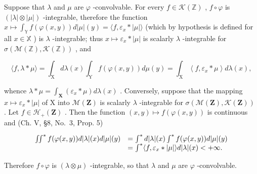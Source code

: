 Suppose that \(\lambda\) and \(\mu\) are \(\varphi\) -convolvable. For every \(f \in \mathcal{K}(\mathbb{Z})\) , \(f \circ \varphi\) is \((|\lambda| \otimes |\mu|)\) -integrable, therefore the function \(x \mapsto \int_{\mathbb{Y}} f(\varphi(x, y)) d|\mu|(y) = \langle f, \varepsilon_x * |\mu| \rangle\) (which by hypothesis is defined for all \(x \in \mathbb{X}\) ) is \(\lambda\) -integrable; thus \(x \mapsto \varepsilon_x * |\mu|\) is scalarly \(\lambda\) -integrable for \(\sigma(\mathcal{M}(\mathbb{Z}), \mathcal{K}(\mathbb{Z}))\) , and

\[
\langle f, \lambda * \mu \rangle = \int_ {\mathrm{X}} d \lambda (x) \int_ {\mathrm{Y}} f (\varphi (x, y)) d \mu (y) = \int_ {\mathrm{X}} \left\langle f, \varepsilon_ {x} * \mu \right\rangle d \lambda (x),
\]

whence \(\lambda * \mu = \int_{\mathbf{X}} (\varepsilon_x * \mu) d\lambda(x)\) . Conversely, suppose that the mapping \(x \mapsto \varepsilon_x * |\mu|\) of X into \(\mathcal{M}(\mathbf{Z})\) is scalarly \(\lambda\) -integrable for \(\sigma(\mathcal{M}(\mathbf{Z}), \mathcal{K}(\mathbf{Z}))\) . Let \(f \in \mathcal{H}_+(\mathbf{Z})\) . Then the function \((x,y) \mapsto f(\varphi(x,y))\) is continuous and (Ch. V, §8, No.~3, Prop. 5)

\[
\begin{array}{r l} \iint^ {*} f (\varphi (x, y)) d | \lambda | (x) d | \mu | (y) & = \int^ {*} d | \lambda | (x) \int^ {*} f (\varphi (x, y)) d | \mu | (y) \\ & = \int^ {*} \langle f, \varepsilon_ {x} * | \mu | \rangle d | \lambda | (x) <   + \infty . \end{array}
\]

Therefore \(f \circ \varphi\) is \((\lambda \otimes \mu)\) -integrable, so that \(\lambda\) and \(\mu\) are \(\varphi\) -convolvable.

